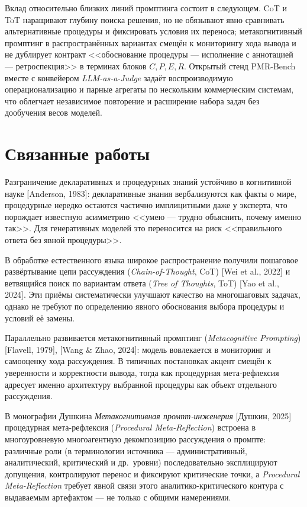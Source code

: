 \documentclass[a4paper,12pt]{article}
\begin{document}
Вклад относительно близких линий промптинга состоит в следующем. CoT и ToT наращивают глубину поиска решения, но не обязывают явно сравнивать альтернативные процедуры и фиксировать условия их переноса; метакогнитивный промптинг в распространённых вариантах смещён к мониторингу хода вывода и не дублирует контракт <<обоснование процедуры --- исполнение с аннотацией --- ретроспекция>> в терминах блоков $C,P,E,R$. Открытый стенд PMR-Bench вместе с конвейером \textit{LLM-as-a-Judge} задаёт воспроизводимую операционализацию и парные агрегаты по нескольким коммерческим системам, что облегчает независимое повторение и расширение набора задач без дообучения весов моделей.

\section{Связанные работы}

Разграничение декларативных и процедурных знаний устойчиво в когнитивной науке [Anderson, 1983]: декларативные знания вербализуются как факты о мире, процедурные нередко остаются частично имплицитными даже у эксперта, что порождает известную асимметрию <<умею --- трудно объяснить, почему именно так>>. Для генеративных моделей это переносится на риск <<правильного ответа без явной процедуры>>.

В обработке естественного языка широкое распространение получили пошаговое развёртывание цепи рассуждения (\textit{Chain-of-Thought}, CoT) [Wei et al., 2022] и ветвящийся поиск по вариантам ответа (\textit{Tree of Thoughts}, ToT) [Yao et al., 2024]. Эти приёмы систематически улучшают качество на многошаговых задачах, однако не требуют по определению явного обоснования выбора процедуры и условий её замены.

Параллельно развивается метакогнитивный промптинг (\textit{Metacognitive Prompting}) [Flavell, 1979], [Wang \& Zhao, 2024]: модель вовлекается в мониторинг и самооценку хода рассуждения. В типичных постановках акцент смещён к уверенности и корректности вывода, тогда как процедурная мета-рефлексия адресует именно архитектуру выбранной процедуры как объект отдельного рассуждения.

В монографии Душкина \textit{Метакогнитивная промпт-инженерия} [Душкин, 2025] процедурная мета-рефлексия (\textit{Procedural Meta-Reflection}) встроена в многоуровневую многоагентную декомпозицию рассуждения о промпте: различные роли (в терминологии источника --- административный, аналитический, критический и др.\ уровни) последовательно эксплицируют допущения, контролируют перенос и фиксируют критические точки, а \textit{Procedural Meta-Reflection} требует явной связи этого аналитико-критического контура с выдаваемым артефактом --- не только с общими намерениями.
\end{document}
